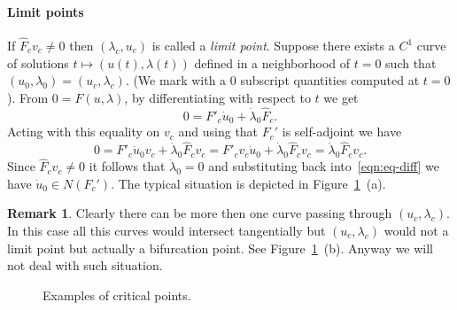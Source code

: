 \documentclass[a4paper,11pt]{article}
\theoremstyle{definition}
\newtheorem{rmk}[prop]{Remark}
\begin{document}
\paragraph{Limit points} If $\hat{F}_cv_c\neq0$ then $(\lambda_c,u_c)$ is called a \emph{limit point}. Suppose there exists a $C^1$ curve of solutions $t\mapsto(u(t),\lambda(t))$ defined in a neighborhood of $t=0$ such that $(u_0,\lambda_0)=(u_c,\lambda_c)$. (We mark with a 0 subscript quantities computed at $t=0$). From $0=F(u,\lambda)$, by differentiating with respect to $t$ we get
\begin{equation}
\label{eqn:eq-diff}
0=F'_c\dot u_0+\dot\lambda_0\hat{F}_c.
\end{equation}
Acting with this equality on $v_c$ and using that $F_c'$ is self-adjoint we have
\[
0=F'_c\dot u_0v_c+\dot\lambda_0\hat{F}_cv_c=F'_cv_c\dot u_0+\dot\lambda_0\hat{F}_cv_c=\dot\lambda_0\hat{F}_cv_c.
\]
Since $\hat{F}_cv_c\neq0$ it follows that $\dot\lambda_0=0$ and substituting back into~\eqref{eqn:eq-diff} we have $\dot u_0\in N(F_c')$. The typical situation is depicted in Figure~\ref{fig:critical-points}~(a).
\begin{rmk}
Clearly there can be more then one curve passing through $(u_c,\lambda_c)$. In this case all this curves would intersect tangentially but $(u_c,\lambda_c)$ would not a limit point but actually a bifurcation point. See Figure~\ref{fig:critical-points}~(b). Anyway we will not deal with such situation.
\end{rmk}

\begin{figure}[t]
\centering
\footnotesize

\quad
{}
\quad
{}

\caption{Examples of critical points.}
\label{fig:critical-points}
\end{figure}
\end{document}
